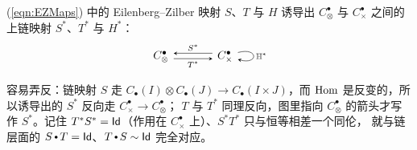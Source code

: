 (\ref{eqn:EZMaps}) 中的 Eilenberg--Zilber 映射 $S$、$T$ 与 $H$ 诱导出
$C_{\otimes}^{\bullet}$ 与 $C_{\times}^{\bullet}$ 之间的上链映射 $S^*$、$T^*$ 与 $H^*$：
$$
\begin{tikzcd}[arrow style=tikz,>=stealth,row sep=2.5em,column sep=3.5em]
C_{\otimes}^{\bullet}
  \arrow[r, shift left, <-, "S^*"]
&
C_{\times}^{\bullet}
  \arrow[l, shift left, <-, "T^*"]
  \arrow[loop right, "\mathbb{H}^{\ast}"]
\end{tikzcd}
$$

\begin{yizhu}
容易弄反：链映射 $S$ 走 $C_{\bullet}(I)\otimes C_{\bullet}(J)\to C_{\bullet}(I\times J)$，而
$\operatorname{\operatorname{Hom}}$ 是反变的，所以诱导出的 $S^{\ast}$ 反向走 $C_{\times}^{\bullet}\to C_{\otimes}^{\bullet}$；
$T$ 与 $T^{\ast}$ 同理反向，图里指向 $C_{\otimes}^{\bullet}$ 的箭头才写作 $S^*$。记住
$T^{\ast}S^{\ast}=\operatorname{\mathsf{Id}}$（作用在 $C_{\times}^{\bullet}$ 上）、$S^{\ast}T^{\ast}$ 只与恒等相差一个同伦，
就与链层面的 $S\comp T=\id$、$T\comp S\sim\id$ 完全对应。
\end{yizhu}

